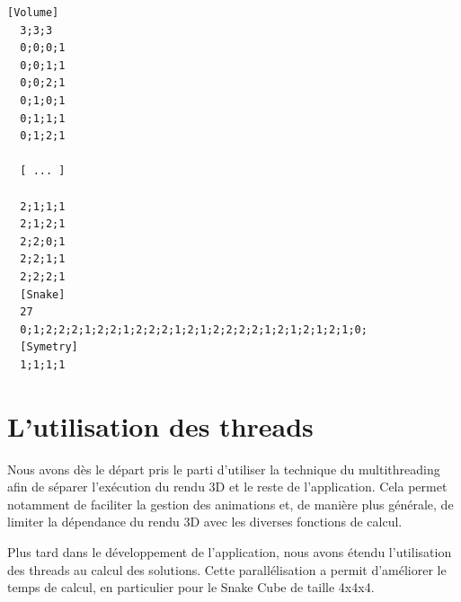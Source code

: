 \newpage
\begin{lstlisting}[caption=Contenu du fichier snake.snake]
 [Volume]
  3;3;3
  0;0;0;1
  0;0;1;1
  0;0;2;1
  0;1;0;1
  0;1;1;1
  0;1;2;1

  [ ... ]

  2;1;1;1
  2;1;2;1
  2;2;0;1
  2;2;1;1
  2;2;2;1
  [Snake]
  27
  0;1;2;2;2;1;2;2;1;2;2;2;1;2;1;2;2;2;2;1;2;1;2;1;2;1;0;
  [Symetry]
  1;1;1;1
\end{lstlisting}\label{.snake}

\section{L'utilisation des threads}
Nous avons dès le départ pris le parti d'utiliser la technique du multithreading afin de séparer l’exécution du rendu 3D et le reste de l'application. Cela permet notamment de faciliter la gestion des animations et, de manière plus générale, de limiter la dépendance du rendu 3D avec les diverses fonctions de calcul.

Plus tard dans le développement de l'application, nous avons étendu l'utilisation des threads au calcul des solutions. Cette parallélisation a permit d'améliorer le temps de calcul, en particulier pour le Snake Cube de taille 4x4x4.\newline

